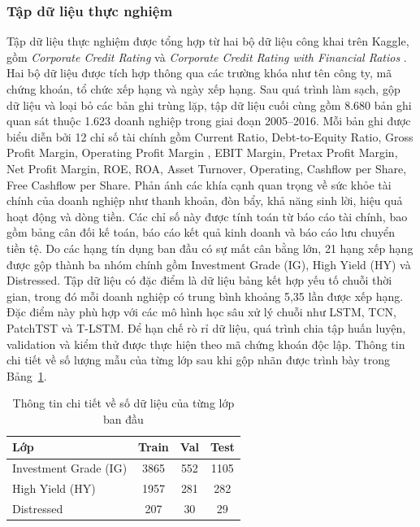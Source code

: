 \documentclass[10pt,twoside]{article}
\begin{document}
\subsubsection{Tập dữ liệu thực nghiệm} Tập dữ liệu thực nghiệm được tổng hợp từ hai bộ dữ liệu công khai trên Kaggle, gồm \textit{Corporate Credit Rating} \cite{noauthor_corporate_credit_rating_nodate} và \textit{Corporate Credit Rating with Financial Ratios} \cite{noauthor_corporate_financial_ratios_nodate}. Hai bộ dữ liệu được tích hợp thông qua các trường khóa như tên công ty, mã chứng khoán, tổ chức xếp hạng và ngày xếp hạng. Sau quá trình làm sạch, gộp dữ liệu và loại bỏ các bản ghi trùng lặp, tập dữ liệu cuối cùng gồm 8.680 bản ghi quan sát thuộc 1.623 doanh nghiệp trong giai đoạn 2005--2016. Mỗi bản ghi được biểu diễn bởi 12 chỉ số tài chính gồm Current Ratio, Debt-to-Equity Ratio, Gross Profit Margin, Operating Profit Margin , EBIT Margin, Pretax Profit Margin, Net Profit Margin, ROE, ROA, Asset Turnover, Operating, Cashflow per Share, Free Cashflow per Share. Phản ánh các khía cạnh quan trọng về sức khỏe tài chính của doanh nghiệp như thanh khoản, đòn bẩy, khả năng sinh lời, hiệu quả hoạt động và dòng tiền. Các chỉ số này được tính toán từ báo cáo tài chính, bao gồm bảng cân đối kế toán, báo cáo kết quả kinh doanh và báo cáo lưu chuyển tiền tệ. Do các hạng tín dụng ban đầu có sự mất cân bằng lớn, 21 hạng xếp hạng được gộp thành ba nhóm chính gồm Investment Grade (IG), High Yield (HY) và Distressed. Tập dữ liệu có đặc điểm là dữ liệu bảng kết hợp yếu tố chuỗi thời gian, trong đó mỗi doanh nghiệp có trung bình khoảng 5,35 lần được xếp hạng. Đặc điểm này phù hợp với các mô hình học sâu xử lý chuỗi như LSTM, TCN, PatchTST và T-LSTM. Để hạn chế rò rỉ dữ liệu, quá trình chia tập huấn luyện, validation và kiểm thử được thực hiện theo mã chứng khoán độc lập. Thông tin chi tiết về số lượng mẫu của từng lớp sau khi gộp nhãn được trình bày trong Bảng~\ref{tab:class_distribution}. 
\begin{table}[H] 
\centering 
\caption{Thông tin chi tiết về số dữ liệu của từng lớp ban đầu} 
\label{tab:class_distribution} 
\begin{tabular}{lccc} 
\hline \textbf{Lớp} & \textbf{Train} & \textbf{Val} & \textbf{Test} \\ \hline Investment Grade (IG) & 3865 & 552 & 1105 \\ High Yield (HY) & 1957 & 281 & 282 \\ Distressed & 207 & 30 & 29 \\ \hline 
\end{tabular} 
\end{table}
\end{document}
